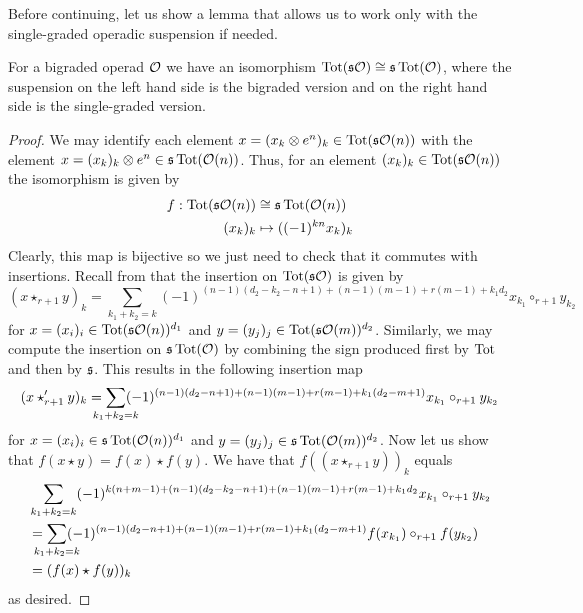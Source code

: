 \documentclass[Thesis.tex]{subfiles}
\begin{document}
Before continuing, let us show a lemma that allows us to work only with the single-graded operadic suspension if needed.
\begin{propo}\label{extrasign}
For a bigraded operad ${\mathcal O}$ we have an isomorphism $\operatorname{Tot}(\mathfrak{s}{\mathcal O})\cong \mathfrak{s} \operatorname{Tot}({\mathcal O})$, where the suspension on the left hand side is the bigraded version and on the right hand side is the single-graded version. 
\end{propo}
\begin{proof}
 We may identify each element $x=(x_k\otimes e^n )_k\in\operatorname{Tot}(\mathfrak{s}{\mathcal O}(n))$ with the element $x=(x_k)_k\otimes e^n\in\mathfrak{s}\operatorname{Tot}({\mathcal O}(n))$. Thus, for an element $(x_k)_k\in \operatorname{Tot}(\mathfrak{s}{\mathcal O}(n))$ the isomorphism is given by
\begin{align*}
f:\operatorname{Tot}(\mathfrak{s}{\mathcal O}(n))&\cong \mathfrak{s} \operatorname{Tot}({\mathcal O}(n))\\
(x_k)_k&\mapsto ((-1)^{kn}x_k)_k
\end{align*}
Clearly, this map is bijective so we just need to check that it commutes with insertions. Recall from  that the insertion on $\operatorname{Tot}(\mathfrak{s}{\mathcal O})$ is given by
\begin{equation*}
(x\star_{r+1} y)_k=\sum_{k_1+k_2=k}(-1)^{(n-1)(d_2-k_2-n+1)+(n-1)(m-1)+r(m-1)+k_1d_2}x_{k_1}\circ_{r+1}y_{k_2}
\end{equation*}
for $x=(x_i)_i\in \operatorname{Tot}(\mathfrak{s}{\mathcal O}(n))^{d_1}$ and $y=(y_j)_j\in \operatorname{Tot}(\mathfrak{s}{\mathcal O}(m))^{d_2}$. Similarly, we may compute the insertion on $\mathfrak{s}\operatorname{Tot}({\mathcal O})$ by combining the sign produced first by $\operatorname{Tot}$ and then by $\mathfrak{s}$. This results in  the following insertion map 
\begin{equation*}
(x\star_{r+1}' y)_k=\sum_{\mathclap{k_1+k_2=k}}(-1)^{(n-1)(d_2-n+1)+(n-1)(m-1)+r(m-1)+k_1(d_2-m+1)}x_{k_1}\circ_{r+1}y_{k_2}
\end{equation*}
for $x=(x_i)_i\in \mathfrak{s}\operatorname{Tot}({\mathcal O}(n))^{d_1}$ and $y=(y_j)_j\in \mathfrak{s}\operatorname{Tot}({\mathcal O}(m))^{d_2}$. Now let us show that $f(x\star y)=f(x)\star f(y)$. We have that $f((x\star_{r+1} y))_k$ equals 
\begin{align*}
&\sum_{k_1+k_2=k}(-1)^{k(n+m-1)+(n-1)(d_2-k_2-n+1)+(n-1)(m-1)+r(m-1)+k_1d_2}x_{k_1}\circ_{r+1}y_{k_2}\\
&=\sum_{\mathclap{k_1+k_2=k}}(-1)^{(n-1)(d_2-n+1)+(n-1)(m-1)+r(m-1)+k_1(d_2-m+1)}f(x_{k_1})\circ_{r+1}f(y_{k_2})\\
&=(f(x)\star f(y))_k
\end{align*}
as desired.
\end{proof}
\end{document}
